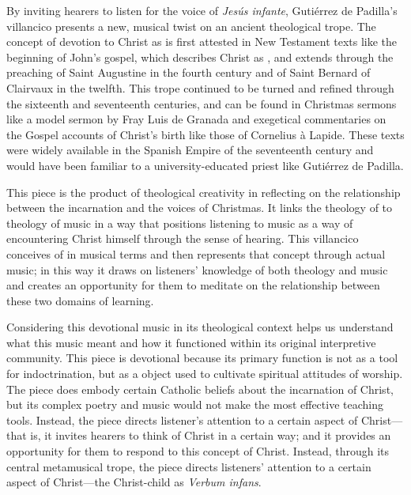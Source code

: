 By inviting hearers to listen for the voice of \emph{Jesús infante}, Gutiérrez
de Padilla's villancico presents a new, musical twist on an ancient theological
trope.
The concept of devotion to Christ as  is first attested
in New Testament texts like the beginning of John's gospel, which describes
Christ as , and extends through the preaching of
Saint Augustine in the fourth century and of Saint Bernard of Clairvaux in the
twelfth.
This trope continued to be turned and refined through the sixteenth and
seventeenth centuries, and can be found in Christmas sermons like a model sermon
by Fray Luis de Granada and exegetical commentaries on the Gospel accounts of
Christ's birth like those of Cornelius à Lapide.
These texts were widely available in the Spanish Empire of the seventeenth
century and would have been familiar to a university-educated priest like
Gutiérrez de Padilla.

This piece is the product of theological creativity in reflecting on the
relationship between the incarnation and the voices of Christmas. 
It links the theology of  to theology of music in a way that
positions listening to music as a way of encountering Christ himself through the
sense of hearing.
This villancico conceives of  in musical terms and then
represents that concept through actual music; in this way it draws on listeners'
knowledge of both theology and music and creates an opportunity for them to
meditate on the relationship between these two domains of learning.

Considering this devotional music in its theological context helps us understand
what this music meant and how it functioned within its original interpretive
community.
This piece is devotional because its primary function is not as a tool for
indoctrination, but as a object used to cultivate spiritual attitudes of
worship.
The piece does embody certain Catholic beliefs about the incarnation of Christ,
but its complex poetry and music would not make the most effective teaching
tools.
Instead, the piece directs listener's attention to a certain aspect of
Christ---that is, it invites hearers to think of Christ in a certain way; and it
provides an opportunity for them to respond to this concept of Christ.
Instead, through its central metamusical trope, the piece directs listeners'
attention to a certain aspect of Christ---the Christ-child as \emph{Verbum
infans}.

